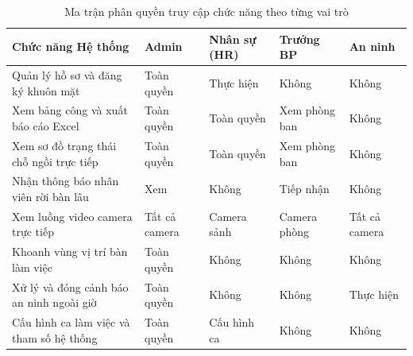\documentclass[12pt,a4paper]{article}
\begin{document}
\begin{table}[H]
\centering
\caption{Ma trận phân quyền truy cập chức năng theo từng vai trò}
\begin{tabular}{|L{\tabcolsep\relax}|C{\tabcolsep\relax}|C{\tabcolsep\relax}|C{\tabcolsep\relax}|C{\tabcolsep\relax}|}
\hline
{}
\textbf{Chức năng Hệ thống} & \textbf{Admin} & \textbf{Nhân sự (HR)} & \textbf{Trưởng BP} & \textbf{An ninh} \\
\hline
Quản lý hồ sơ và đăng ký khuôn mặt & Toàn quyền & Thực hiện & Không & Không \\
\hline
{}
Xem bảng công và xuất báo cáo Excel & Toàn quyền & Toàn quyền & Xem phòng ban & Không \\
\hline
Xem sơ đồ trạng thái chỗ ngồi trực tiếp & Toàn quyền & Toàn quyền & Xem phòng ban & Không \\
\hline
{}
Nhận thông báo nhân viên rời bàn lâu & Xem & Không & Tiếp nhận & Không \\
\hline
Xem luồng video camera trực tiếp & Tất cả camera & Camera sảnh & Camera phòng & Tất cả camera \\
\hline
{}
Khoanh vùng vị trí bàn làm việc & Toàn quyền & Không & Không & Không \\
\hline
Xử lý và đóng cảnh báo an ninh ngoài giờ & Toàn quyền & Không & Không & Thực hiện \\
\hline
{}
Cấu hình ca làm việc và tham số hệ thống & Toàn quyền & Cấu hình ca & Không & Không \\
\hline
\end{tabular}
\end{table}

\newpage
\end{document}
